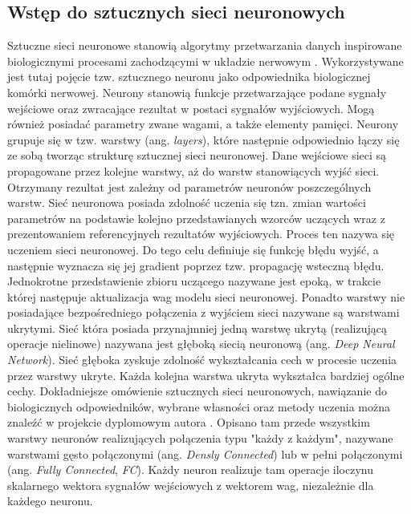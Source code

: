 \subsection{Wstęp do sztucznych sieci neuronowych}
Sztuczne sieci neuronowe stanowią algorytmy przetwarzania danych inspirowane biologicznymi procesami zachodzącymi w układzie nerwowym \cite{SN_tadeusiewicz}. 
Wykorzystywane jest tutaj pojęcie tzw. sztucznego neuronu jako odpowiednika biologicznej komórki nerwowej. 
Neurony stanowią funkcje przetwarzające podane sygnały wejściowe oraz zwracające rezultat w postaci sygnałów wyjściowych. 
Mogą również posiadać parametry zwane wagami, a także elementy pamięci.
Neurony grupuje się w tzw. warstwy (ang. \emph{layers}), które następnie odpowiednio łączy się ze sobą tworząc strukturę sztucznej sieci neuronowej.
Dane wejściowe sieci są propagowane przez kolejne warstwy, aż do warstw stanowiących wyjść sieci.
Otrzymany rezultat jest zależny od parametrów neuronów poszczególnych warstw.
Sieć neuronowa posiada zdolność uczenia się tzn. zmian wartości parametrów na podstawie kolejno przedstawianych wzorców uczących wraz z prezentowaniem referencyjnych rezultatów wyjściowych.
Proces ten nazywa się uczeniem sieci neuronowej.
Do tego celu definiuje się funkcję błędu wyjść, a następnie wyznacza się jej gradient poprzez tzw. propagację wsteczną błędu.
Jednokrotne przedstawienie zbioru uczącego nazywane jest epoką, w trakcie której następuje aktualizacja wag modelu sieci neuronowej.
Ponadto warstwy nie posiadające bezpośredniego połączenia z wyjściem sieci nazywane są warstwami ukrytymi.
Sieć która posiada przynajmniej jedną warstwę ukrytą (realizującą operacje nielinowe) nazywana jest głęboką siecią neuronową (ang. \emph{Deep Neural Network}).
Sieć głęboka zyskuje zdolność wykształcania cech w procesie uczenia przez warstwy ukryte. 
Każda kolejna warstwa ukryta wykształca bardziej ogólne cechy. 
Dokładniejsze omówienie sztucznych sieci neuronowych, nawiązanie do biologicznych odpowiedników, wybrane własności oraz metody uczenia można znaleźć 
w projekcie dyplomowym autora \cite{inż}. 
Opisano tam przede wszystkim warstwy neuronów realizujących połączenia typu "każdy z każdym", nazywane warstwami gęsto połączonymi (ang. \emph{Densly Connected}) lub w pełni połączonymi (ang. \emph{Fully Connected}, \emph{FC}). 
Każdy neuron realizuje tam operacje iloczynu skalarnego wektora sygnałów wejściowych z wektorem wag, niezależnie dla każdego neuronu.

